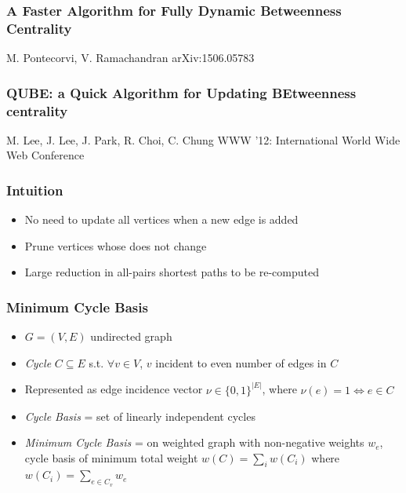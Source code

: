 \begin{frame}
  \frametitle{A Faster Algorithm for Fully Dynamic Betweenness Centrality}
  \centering
  \vfill
  {\huge M. Pontecorvi, V. Ramachandran}
  \vfill
  {\large arXiv:1506.05783}
\end{frame}


\begin{frame}
  \frametitle{QUBE: a Quick Algorithm for Updating BEtweenness centrality}
  \centering
  \vfill
  {\huge M. Lee, J. Lee, J. Park, R. Choi, C. Chung}
  \vfill
  {\large WWW '12: International World Wide Web Conference}
\end{frame}

\begin{frame}
  \frametitle{Intuition}
  
  \begin{itemize}
    \item No need to update all vertices when a new edge is added
    \item Prune vertices whose \betw does not change
    \item Large reduction in all-pairs shortest paths to be re-computed
  \end{itemize}
\end{frame}


\begin{frame}
  \frametitle{Minimum Cycle Basis}
  
  \begin{itemize}
    \item $G=(V,E)$ undirected graph
    \item \emph{Cycle} $C \subseteq E$ s.t. $\forall v \in V$, $v$ incident to even number of edges in $C$
    \item Represented as edge incidence vector $\nu \in \{ 0,1 \}^{|E|}$, where $\nu(e) = 1 \iff e \in C$ 
    \item \emph{Cycle Basis} = set of linearly independent cycles
    \item \emph{Minimum Cycle Basis} = on weighted graph with non-negative weights $w_e$, cycle basis of minimum total weight $w(C) = \sum_{i} w(C_i)$ where $w(C_i) = \sum_{e \in C_v} w_e$
  \end{itemize}  
\end{frame}


